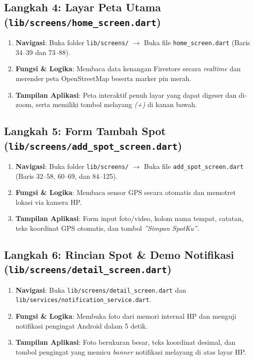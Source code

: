 \documentclass[12pt,a4paper]{article}
\begin{document}
\subsection{Langkah 4: Layar Peta Utama (\texttt{lib/screens/home\_screen.dart})}
\begin{enumerate}[leftmargin=*]
    \item \textbf{Navigasi}: Buka folder \texttt{lib/screens/} $\rightarrow$ Buka file \texttt{home\_screen.dart} (Baris 34--39 dan 73--88).
    \item \textbf{Fungsi \& Logika}: Membaca data kenangan Firestore secara \textit{realtime} dan merender peta OpenStreetMap beserta marker pin merah.
    \item \textbf{Tampilan Aplikasi}: Peta interaktif penuh layar yang dapat digeser dan di-zoom, serta memiliki tombol melayang \textit{(+)} di kanan bawah.
\end{enumerate}

\subsection{Langkah 5: Form Tambah Spot (\texttt{lib/screens/add\_spot\_screen.dart})}
\begin{enumerate}[leftmargin=*]
    \item \textbf{Navigasi}: Buka folder \texttt{lib/screens/} $\rightarrow$ Buka file \texttt{add\_spot\_screen.dart} (Baris 32--58, 60--69, dan 84--125).
    \item \textbf{Fungsi \& Logika}: Membaca sensor GPS secara otomatis dan memotret lokasi via kamera HP.
    \item \textbf{Tampilan Aplikasi}: Form input foto/video, kolom nama tempat, catatan, teks koordinat GPS otomatis, dan tombol \textit{''Simpan SpotKu''}.
\end{enumerate}

\subsection{Langkah 6: Rincian Spot \& Demo Notifikasi (\texttt{lib/screens/detail\_screen.dart})}
\begin{enumerate}[leftmargin=*]
    \item \textbf{Navigasi}: Buka \texttt{lib/screens/detail\_screen.dart} dan \texttt{lib/services/notification\_service.dart}.
    \item \textbf{Fungsi \& Logika}: Membuka foto dari memori internal HP dan menguji notifikasi pengingat Android dalam 5 detik.
    \item \textbf{Tampilan Aplikasi}: Foto berukuran besar, teks koordinat desimal, dan tombol pengingat yang memicu \textit{banner} notifikasi melayang di atas layar HP.
\end{enumerate}
\end{document}
